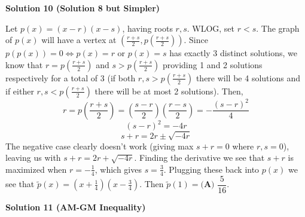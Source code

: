 \begin{enumerate}
 



\textbf{Solution 10 (Solution 8 but Simpler)}

Let $p(x) = (x-r)(x-s)$, having roots $r, s$. WLOG, set $r<s$. The graph of $p(x)$ will have a vertex at $(\frac{r+s}{2}, p(\frac{r+s}{2}))$. Since $p(p(x)) = 0 \iff p(x) = r$ or $p(x) = s$ has exactly 3 distinct solutions, we know that $r = p(\frac{r+s}{2})$ and $s > p(\frac{r+s}{2})$ providing 1 and 2 solutions respectively for a total of 3 (if both $r,s > p(\frac{r+s}{2})$ there will be 4 solutions and if either $r,s<p(\frac{r+s}{2})$ there will be at most 2 solutions). Then,
 \[r = p(\frac{r+s}{2}) = \left(\frac{s-r}{2}\right)\left(\frac{r-s}{2}\right) = -\frac{(s-r)^2}{4}\]
 \[(s-r)^2 = -4r\]
 \[s+r = 2r\pm\sqrt{-4r}\]The negative case clearly doesn't work (giving max $s+r=0$ where $r,s=0$), leaving us with $s+r = 2r+\sqrt{-4r}$. Finding the derivative we see that $s+r$ is maximized when $r = -\frac{1}{4}$, which gives $s = \frac{3}{4}$. Plugging these back into $p(x)$ we see that $\tilde{p}(x)=(x+\frac{1}{4})(x-\frac{3}{4})$. Then $\tilde{p}(1) = \boxed{\textbf{(A) } \dfrac{5}{16}}$.

 



\textbf{Solution 11 (AM-GM Inequality)}


\end{enumerate}
